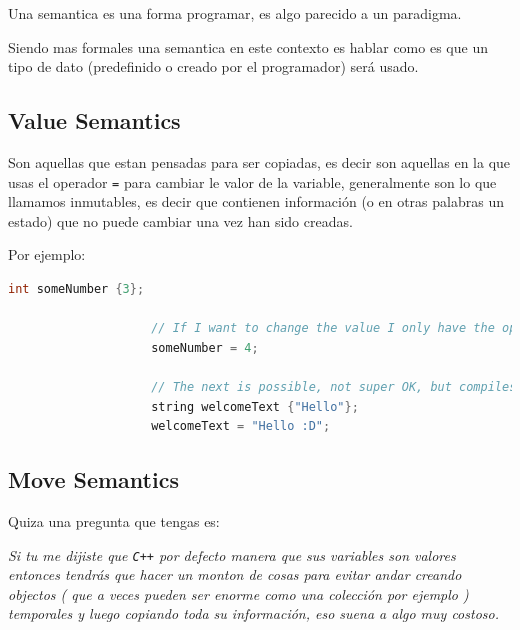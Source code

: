 \documentclass[12pt, fleqn]{report}                             %
\theoremstyle{break}                                            %
\newcommand{\textCode}[1]  { \texttt{#1} }                      %
\newcommand{\Cpp}{\ignorespaces\textCode{C++}}                  %
\begin{document}
            Una semantica es una forma programar, es algo parecido a un paradigma.
            
            Siendo mas formales una semantica en este contexto es hablar
            como es que un tipo de dato (predefinido o creado por el programador) será usado.

            \subsection{Value Semantics}  
            
                Son aquellas que estan pensadas para ser copiadas, es decir son aquellas en la que usas
                el operador \textCode{=} para cambiar le valor de la variable, generalmente son lo que llamamos
                inmutables, es decir que contienen información (o en otras palabras un estado) que no puede
                cambiar una vez han sido creadas.

                Por ejemplo:
                \begin{lstlisting}[language=C++, gobble=20]
                    int someNumber {3};

                    // If I want to change the value I only have the option to use =
                    someNumber = 4;

                    // The next is possible, not super OK, but compiles
                    string welcomeText {"Hello"};
                    welcomeText = "Hello :D";
                \end{lstlisting}
            

            \subsection{Move Semantics}     
            
                Quiza una pregunta que tengas es:

                \textit{
                    Si tu me dijiste que \Cpp por defecto manera que sus variables son valores
                    entonces tendrás que hacer un monton de cosas para evitar andar creando objectos (
                        que a veces pueden ser enorme como una colección por ejemplo
                    ) temporales y luego copiando toda su información, eso suena a algo muy costoso.
                }
\end{document}

